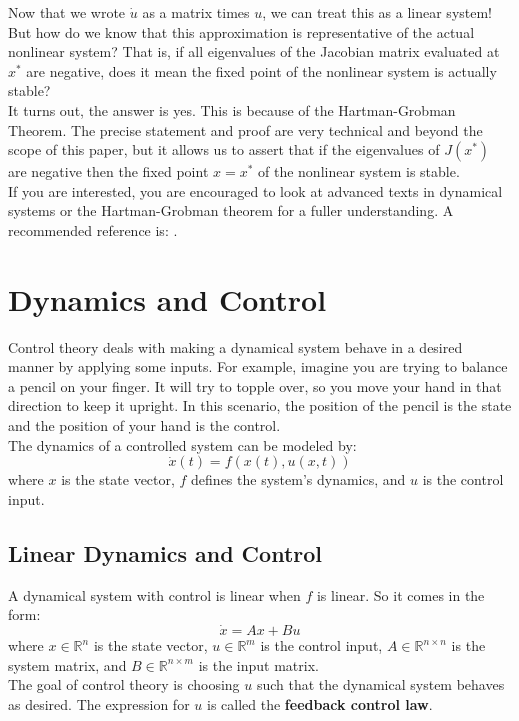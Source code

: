 \documentclass[12pt]{article}
\newcommand{\dx}{\dot{x}}
\newcommand{\du}{\dot{u}}
\begin{document}
Now that we wrote $\du$ as a matrix times $u$, we can treat this as a linear system! But how do we know that this approximation is representative of the actual nonlinear system? That is, if all eigenvalues of the Jacobian matrix evaluated at $x^*$ are negative, does it mean the fixed point of the nonlinear system is actually stable? \\

It turns out, the answer is yes. This is because of the Hartman-Grobman Theorem. The precise statement and proof are very technical and beyond the scope of this paper, but it allows us to assert that if the eigenvalues of $J(x^*)$ are negative then the fixed point $x = x^*$ of the nonlinear system is stable. \\

If you are interested, you are encouraged to look at advanced texts in dynamical systems or the Hartman-Grobman theorem for a fuller understanding. A recommended reference is: \cite{Deng}.

\section{Dynamics and Control}

Control theory deals with making a dynamical system behave in a desired manner by applying some inputs. For example, imagine you are trying to balance a pencil on your finger. It will try to topple over, so you move your hand in that direction to keep it upright. In this scenario, the position of the pencil is the state and the position of your hand is the control. \\

The dynamics of a controlled system can be modeled by:
$$\dx(t) = f(x(t), u(x, t))$$
where $x$ is the state vector, $f$ defines the system's dynamics, and $u$ is the control input.

\subsection{Linear Dynamics and Control}

A dynamical system with control is linear when $f$ is linear. So it comes in the form:
$$\dx = Ax + Bu$$
where $x \in \mathbb{R}^n$ is the state vector, $u \in \mathbb{R}^m$ is the control input, $A \in \mathbb{R}^{n \times n}$ is the system matrix, and $B \in \mathbb{R}^{n \times m}$ is the input matrix. \\

The goal of control theory is choosing $u$ such that the dynamical system behaves as desired. The expression for $u$ is called the \textbf{feedback control law}. \\
\end{document}
